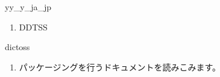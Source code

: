 \begin{prework}{ yy\_y\_ja\_jp }
  \begin{enumerate}
  \item DDTSS
  \end{enumerate}
\end{prework}

\begin{prework}{ dictoss }
  \begin{enumerate}
  \item パッケージングを行うドキュメントを読みこみます。
  \end{enumerate}
\end{prework}
